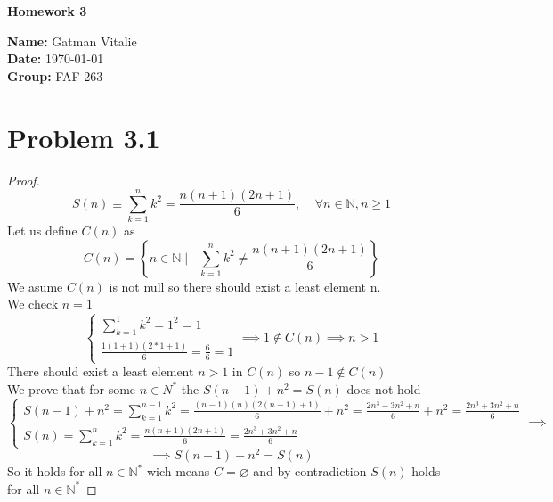 \documentclass[12pt]{article}
\begin{document}
\begin{titlepage}
    \thispagestyle{fancy} %
    \centering
    
    \vspace*{4cm}

    {\Huge \bfseries Homework 3}

    \vspace{4cm}

    {\Large \textbf{Name:} Gatman Vitalie} \\[0.5em]
    {\Large \textbf{Date:} \today} \\[0.5em]
    {\Large \textbf{Group:} FAF-263}

    \vfill
\end{titlepage}

\newpage

\section*{Problem 3.1}
\begin{proof}
\[S(n) \equiv  \sum_{k=1}^{n}{k^2}=\frac{n(n+1)(2n+1)}{6}, \;\;\;\; \forall n \in \mathbb{N}, n \ge 1\]
Let us define $C(n)$ as 
\[C(n)=\left\{n \in \mathbb{N}\;| \;\;\; \sum_{k=1}^{n}{k^2}\not=\frac{n(n+1)(2n+1)}{6}\right\}\]
We asume $C(n)$ is not null so there should exist a least element n.\\
We check $n=1$
\[
\begin{cases}
    {
\sum_{k=1}^{1}{k^2}=1^2=1}\\
    {\frac{1(1+1)(2*1+1)}{6}=\frac{6}{6}=1}
    

\end{cases}
\implies 1 \not\in C(n) \implies n>1
\]
There should exist a least element $n>1$ in $C(n)$ so $n-1 \not\in C(n)$ \\
We prove that for some $n\in N^*$ the $S(n-1)+n^2=S(n)$ does not hold
\[
\begin{cases}
    S(n-1) + n^2 = \sum_{k=1}^{n-1}{k^2}=\frac{(n-1)(n)(2(n-1)+1)}{6} + n^2 = \frac{2n^3-3n^2+n}{6}+n^2 = \frac{2n^3+3n^2+n}{6}\\
    S(n)=\sum_{k=1}^{n}{k^2}=\frac{n(n+1)(2n+1)}{6} = \frac{2n^3+3n^2+n}{6}
\end{cases}
\implies\]\[
\implies S(n-1)+n^2=S(n)
\]
So it holds for all $n\in \mathbb{N}^*$ wich means $C = \varnothing$ and by contradiction $S(n)$ holds for all $n \in \mathbb{N}^*$
\end{proof}
\end{document}

